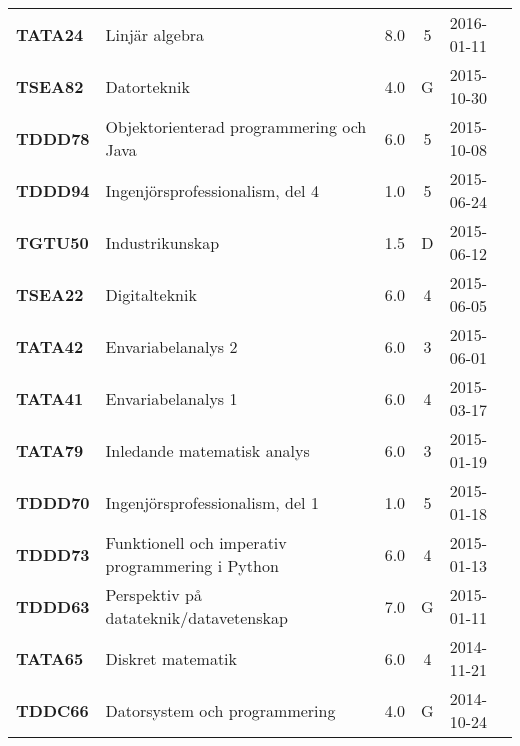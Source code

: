 \documentclass[a4paper,notitlepage]{article}
\begin{document}
\begin{longtable}[h]{l l l c l}
    \textbf{TATA24} & Linjär algebra	                                       & 8.0&5	&2016-01-11 \\
    \textbf{TSEA82} & Datorteknik	                                       & 4.0&G	&2015-10-30 \\
    \textbf{TDDD78} & Objektorienterad programmering och Java	           & 6.0&5	&2015-10-08 \\
    \textbf{TDDD94} & Ingenjörsprofessionalism, del 4	                   & 1.0&5	&2015-06-24 \\
    \textbf{TGTU50} & Industrikunskap	                                   & 1.5&D	&2015-06-12 \\
    \textbf{TSEA22} & Digitalteknik	                                       & 6.0&4	&2015-06-05 \\
    \textbf{TATA42} & Envariabelanalys 2	                                   & 6.0&3	&2015-06-01 \\
    \textbf{TATA41} & Envariabelanalys 1	                                   & 6.0&4	&2015-03-17 \\
    \textbf{TATA79} & Inledande matematisk analys	                       & 6.0&3	&2015-01-19 \\
    \textbf{TDDD70} & Ingenjörsprofessionalism, del 1	                   & 1.0&5	&2015-01-18 \\
    \textbf{TDDD73} & Funktionell och imperativ programmering i Python	   & 6.0&4	&2015-01-13 \\
    \textbf{TDDD63} & Perspektiv på datateknik/datavetenskap	               & 7.0&G	&2015-01-11 \\
    \textbf{TATA65} & Diskret matematik	                                   & 6.0&4	&2014-11-21 \\
    \textbf{TDDC66} & Datorsystem och programmering	                       & 4.0&G	&2014-10-24 \\
\end{longtable}
\end{document}
